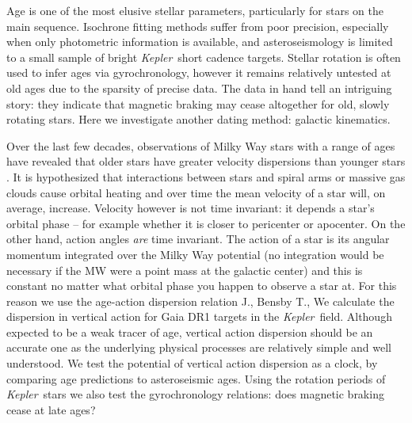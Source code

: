 \documentclass[useAMS, usenatbib, preprint, 12pt]{aastex}
\newcommand{\Kepler}{{\it Kepler}}
\newcommand{\kepler}{\Kepler}
\newcommand{\eg}{{\it e.g.}}
\begin{document}
Age is one of the most elusive stellar parameters, particularly for stars on
the main sequence.
Isochrone fitting methods suffer from poor precision, especially when only
photometric information is available, and asteroseismology is limited to a
small sample of bright \kepler\ short cadence targets.
Stellar rotation is often used to infer ages via gyrochronology, however it
remains relatively untested at old ages due to the sparsity of precise data.
The data in hand tell an intriguing story: they indicate that magnetic braking
may cease altogether for old, slowly rotating stars.
Here we investigate another dating method: galactic kinematics.

Over the last few decades, observations of Milky Way stars with a range of
ages have revealed that older stars have greater velocity dispersions than
younger stars \citep[\eg][]{casagrande2011, aumer2011}.
It is hypothesized that interactions between stars and spiral arms or massive
gas clouds cause orbital heating and over time the mean velocity of a star
will, on average, increase.
Velocity however is not time invariant: it depends a star's orbital phase --
for example whether it is closer to pericenter or apocenter.
On the other hand, action angles {\it are} time invariant.
The action of a star is its angular momentum integrated over the Milky Way
potential (no integration would be necessary if the MW were a point mass at
the galactic center) and this is constant no matter what orbital phase you
happen to observe a star at.
For this reason we use the age-action dispersion relation
J., Bensby T.,
We calculate the dispersion in vertical action for Gaia DR1 targets in the
\kepler\ field.
Although expected to be a weak tracer of age, vertical action dispersion
should be an accurate one as the underlying physical processes are relatively
simple and well understood.
We test the potential of vertical action dispersion as a clock, by comparing
age predictions to asteroseismic ages.
Using the rotation periods of \kepler\ stars we also test the gyrochronology
relations: does magnetic braking cease at late ages?
\end{document}
